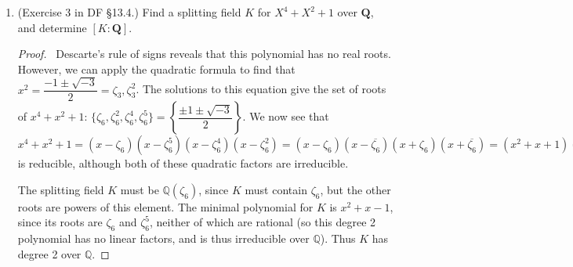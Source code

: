 \documentclass[10pt]{article}
\newcommand{\Q}{\mathbb{Q}}
\begin{document}
\begin{enumerate}[leftmargin=0cm,itemindent=.5cm,labelwidth=\itemindent,labelsep=0cm,align=left]
\item (Exercise 3 in DF \S 13.4.) Find a splitting field $K$ for $X^4+X^2+1$ over $\mathbf{Q}$, and determine $[K:\mathbf{Q}]$.

\begin{proof}

\ Descarte's rule of signs reveals that this polynomial has no real roots.  However, we can apply the quadratic formula to find that $x^2 = \dfrac{-1 \pm \sqrt{-3}}{2} = \zeta_3, \zeta_3^2$.  The solutions to this equation give the set of roots of $x^4 + x^2 + 1$: $\{ \zeta_6, \zeta_6^2, \zeta_6^4, \zeta_6^5  \} = \left\{ \dfrac{\pm 1 \pm \sqrt{-3}}{2} \right\}$.  We now see that
$x^4 + x^2 + 1 = (x-\zeta_6)(x-\zeta_6^5)(x-\zeta_6^4)(x-\zeta_6^2) = (x - \zeta_6)(x - \overline{\zeta_6})(x + \zeta_6)(x + \overline{\zeta_6}) =  \left(x^2 + x + 1\right)\left(x^2 - x + 1\right)$
is reducible, although both of these quadratic factors are irreducible.

The splitting field $K$ must be $\Q(\zeta_6)$, since $K$ must contain $\zeta_6$, but the other roots are powers of this element.  The minimal polynomial for $K$ is $x^2 + x - 1$, since its roots are $\zeta_6$ and $\zeta_6^5$, neither of which are rational (so this degree 2 polynomial has no linear factors, and is thus irreducible over $\Q$).  Thus $K$ has degree 2 over $\Q$.

\end{proof}

\end{enumerate}
\end{document}
